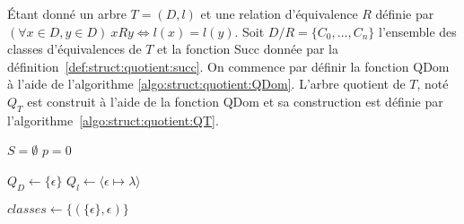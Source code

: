 \begin{definition}
    Étant donné un arbre $T = (D, l)$ et une relation d'équivalence $R$ définie par $(\forall x \in D, y \in D) ~ x R y \iff l(x) = l(y)$.
    Soit $D/R = \{C_0, \dots, C_n\}$ l'ensemble des classes d'équivalences de $T$ et la fonction \textsf{Succ} donnée par la définition~\ref{def:struct:quotient:succ}.
    On commence par définir la fonction \textsf{QDom} à l'aide de l'algorithme \ref{algo:struct:quotient:QDom}.
    L'arbre quotient de $T$, noté $Q_T$ est construit à l'aide de la fonction \textsf{QDom} et sa construction est définie par l'algorithme~\ref{algo:struct:quotient:QT}.\\

    \begin{algorithm}[H]
        \caption{$\textsf{QDom}(C_i, u)$}
        \label{algo:struct:quotient:QDom}

        $S = \emptyset$\;
        $p = 0$\;
    \end{algorithm}

    \begin{algorithm}[H]
        \caption{$Q_T(T = (D, l))$}
        \label{algo:struct:quotient:QT}

        $Q_D \gets \{\epsilon\}$\;
        $Q_l \gets \langle \epsilon \mapsto \lambda \rangle$\;

        $classes \gets \{(\{\epsilon\}, \epsilon)\}$\;

    \end{algorithm}
\end{definition}


